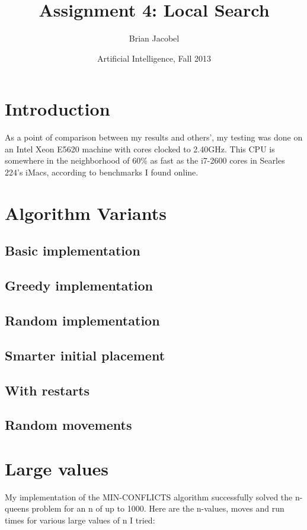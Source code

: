 \documentclass{article}
\title{Assignment 4: Local Search}
\author{Brian Jacobel}
\date{Artificial Intelligence, Fall 2013}
\begin{document}
\maketitle

\begin{doublespace}

\section{Introduction}
As a point of comparison between my results and others', my testing was done on an Intel Xeon E5620 machine with cores clocked to 2.40GHz. This CPU is somewhere in the neighborhood of 60\% as fast as the i7-2600 cores in Searles 224's iMacs, according to benchmarks I found online.

\section{Algorithm Variants}
\subsection{Basic implementation}
\subsection{Greedy implementation}
\subsection{Random implementation}

\subsection{Smarter initial placement}

\subsection{With restarts}

\subsection{Random movements}

\section{Large values}
My implementation of the MIN-CONFLICTS algorithm successfully solved the n-queens problem for an n of up to 1000. Here are the n-values, moves and run times for various large values of n I tried:\\


\end{doublespace}
\end{document}
